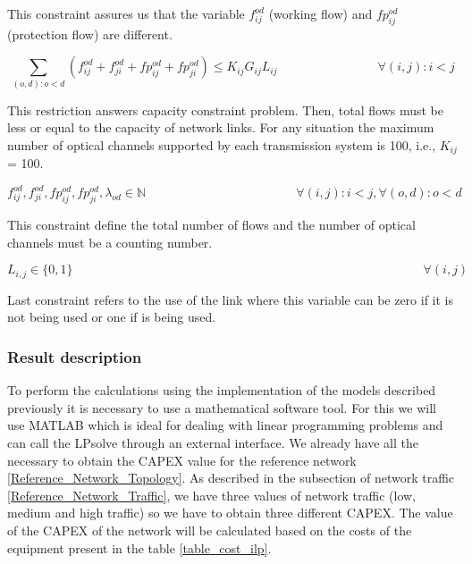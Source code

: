 This constraint assures us that the variable $f_{ij}^{od}$ (working flow) and $fp_{ij}^{od}$ (protection flow) are different.

\begin{equation}
\sum_{(o,d):o<d} \left(f_{ij}^{od} + f_{ji}^{od} + fp_{ij}^{od} + fp_{ji}^{od}\right) \leq K_{ij} G_{ij} L_{ij} \qquad \qquad \qquad \qquad
\forall(i,j) : i < j
\label{ILPTransp4}
\end{equation}

This restriction answers capacity constraint problem. Then, total flows must be less or equal to the capacity of network links. For any situation the maximum number of optical channels supported by each transmission system is 100, i.e., $K_{ij}$ = 100.

\begin{equation}
f_{ij}^{od} , f_{ji}^{od} , fp_{ij}^{od} , fp_{ji}^{od} , \lambda_{od} \in \mathbb{N}   \qquad \qquad \qquad \qquad \qquad \qquad
\forall(i,j) : i < j, \forall(o,d) : o < d
\label{ILPTransp5}
\end{equation}

This constraint define the total number of flows and the number of optical channels must be a counting number.

\begin{equation}
L_{i,j} \in \{0,1\} \qquad \qquad \qquad \qquad \qquad \qquad \qquad \qquad \qquad \qquad \qquad \qquad \qquad \qquad
\forall(i,j)
\label{ILPTranspL1}
\end{equation}

Last constraint refers to the use of the link where this variable can be zero if it is not being used or one if is being used.\\


\subsubsection{Result description}

To perform the calculations using the implementation of the models described previously it is necessary to use a mathematical software tool. For this we will use MATLAB which is ideal for dealing with linear programming problems and can call the LPsolve through an external interface. We already have all the necessary to obtain the CAPEX value for the reference network \ref{Reference_Network_Topology}. As described in the subsection of network traffic \ref{Reference_Network_Traffic}, we have three values of network traffic (low, medium and high traffic) so we have to obtain three different CAPEX. The value of the CAPEX of the network will be calculated based on the costs of the equipment present in the table \ref{table_cost_ilp}.\\

